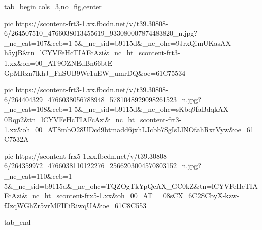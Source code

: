  
 
 
 
 


\ifcmt
  tab_begin cols=3,no_fig,center

     pic https://scontent-frt3-1.xx.fbcdn.net/v/t39.30808-6/264507510_4766038013455619_933080007874483820_n.jpg?_nc_cat=107&ccb=1-5&_nc_sid=b9115d&_nc_ohc=9JrxQimUKasAX-h5yjB&tn=lCYVFeHcTIAFcAzi&_nc_ht=scontent-frt3-1.xx&oh=00_AT9OZNEdBn66btE-GpMRzn7lkhJ_FnSUB9We1uEW_umrDQ&oe=61C75534

     pic https://scontent-frt3-1.xx.fbcdn.net/v/t39.30808-6/264404329_4766038056788948_5781048929098261523_n.jpg?_nc_cat=108&ccb=1-5&_nc_sid=b9115d&_nc_ohc=sKbq9faBdqkAX-0Bqp2&tn=lCYVFeHcTIAFcAzi&_nc_ht=scontent-frt3-1.xx&oh=00_AT8mbO28UDcd9btmadd6jxhLJcbb7SgIsLlNOfahRxtVyw&oe=61C7532A

     pic https://scontent-frx5-1.xx.fbcdn.net/v/t39.30808-6/264359972_4766038110122276_2566203004570803152_n.jpg?_nc_cat=110&ccb=1-5&_nc_sid=b9115d&_nc_ohc=TQZOgTkYpQcAX_GC0kZ&tn=lCYVFeHcTIAFcAzi&_nc_ht=scontent-frx5-1.xx&oh=00_AT__08sCX_6C2SCbyX-kzw-fJzqWGhZr5vrMFIFiRiwqUA&oe=61C8C553

  tab_end
\fi
